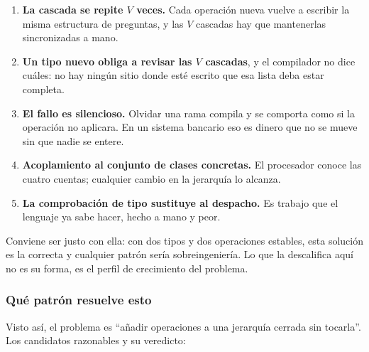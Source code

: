 \begin{enumerate}[leftmargin=1.2cm]
    \item \textbf{La cascada se repite $V$ veces.} Cada operación nueva vuelve a escribir la
          misma estructura de preguntas, y las $V$ cascadas hay que mantenerlas sincronizadas
          a mano.
    \item \textbf{Un tipo nuevo obliga a revisar las $V$ cascadas}, y el compilador no dice
          cuáles: no hay ningún sitio donde esté escrito que esa lista deba estar completa.
    \item \textbf{El fallo es silencioso.} Olvidar una rama compila y se comporta como si la
          operación no aplicara. En un sistema bancario eso es dinero que no se mueve sin que
          nadie se entere.
    \item \textbf{Acoplamiento al conjunto de clases concretas.} El procesador conoce las
          cuatro cuentas; cualquier cambio en la jerarquía lo alcanza.
    \item \textbf{La comprobación de tipo sustituye al despacho.} Es trabajo que el lenguaje
          ya sabe hacer, hecho a mano y peor.
\end{enumerate}

Conviene ser justo con ella: con dos tipos y dos operaciones estables, esta solución es la
correcta y cualquier patrón sería sobreingeniería. Lo que la descalifica aquí no es su forma,
es el perfil de crecimiento del problema.

\subsubsection*{Qué patrón resuelve esto}

Visto así, el problema es ``añadir operaciones a una jerarquía cerrada sin tocarla''. Los
candidatos razonables y su veredicto:

